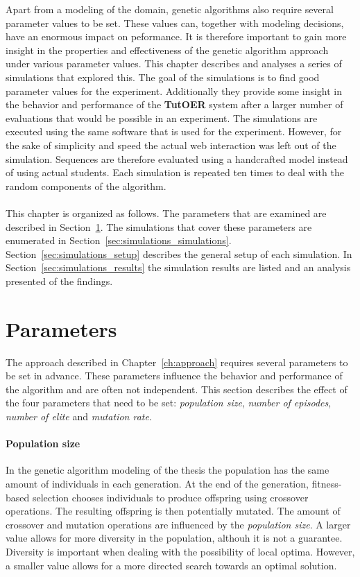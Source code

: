 Apart from a modeling of the domain, genetic algorithms also require several
parameter values to be set. These values can, together with modeling decisions,
have an enormous impact on peformance. It is therefore important to gain more
insight in the properties and effectiveness of the genetic algorithm approach
under various parameter values. This chapter describes and analyses a series of
simulations that explored this. The goal of the simulations is to find good
parameter values for the experiment. Additionally they provide some insight in
the behavior and performance of the \textbf{TutOER} system after a larger number
of evaluations that would be possible in an experiment. The simulations are
executed using the same software that is used for the experiment. However, for
the sake of simplicity and speed the actual web interaction was left out of the
simulation. Sequences are therefore evaluated using a handcrafted model instead
of using actual students. Each simulation is repeated ten times to deal with
the random components of the algorithm.\\\\
\noindent
This chapter is organized as follows. The parameters that are examined are
described in Section~\ref{sec:simulations_parameters}.  The simulations that
cover these parameters are enumerated in
Section~\ref{sec:simulations_simulations}. Section~\ref{sec:simulations_setup}
describes the general setup of each simulation. In
Section~\ref{sec:simulations_results} the simulation results are listed and an
analysis presented of the findings.

\section{Parameters}
\label{sec:simulations_parameters}
The approach described in Chapter~\ref{ch:approach} requires several parameters
to be set in advance. These parameters influence the behavior and performance
of the algorithm and are often not independent. This section describes the
effect of the four parameters that need to be set: \emph{population size},
\emph{number of episodes}, \emph{number of elite} and \emph{mutation rate}.
\paragraph{Population size} In the genetic algorithm modeling of the thesis
the population has the same amount of individuals in each generation. At the
end of the generation, fitness-based selection chooses individuals to produce
offspring using crossover operations. The resulting offspring is then
potentially mutated. The amount of crossover and mutation operations are
influenced by the \emph{population size}. A larger value allows for more
diversity in the population, althouh it is not a guarantee. Diversity is
important when dealing with the possibility of local optima. However, a smaller
value allows for a more directed search towards an optimal solution.
